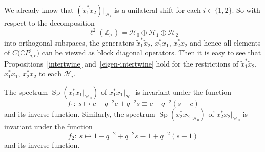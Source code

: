 We already know that $( \tilde{x}_{1}^{\ast}\tilde{x}_{2})
|_{\mathcal{H}_{i}}$ is a unilateral shift for each $i\in\{ 1,2\}
$. So with respect to the decomposition
\[
\ell^{2}( \mathbb{Z}_{\geq}) =\mathcal{H}_{0}\oplus
\mathcal{H}_{1}\oplus\mathcal{H}_{2}%
\]
into orthogonal subspaces, the generators $\tilde{x}_{1}^{\ast}\tilde{x}_{2}$,
$x_{1}^{\ast}x_{1}$, $x_{2}^{\ast}x_{2}$ and hence all elements of $C\big(
\mathbb{C}P_{q,c}^{1}\big) $ can be viewed as block diagonal operators.
Then it is easy to see that Propositions~\ref{intertwine} and~\ref{eigen-intertwine} hold for the
restrictions of $\tilde{x}_{1}^{\ast}\tilde{x}_{2}$, $x_{1}^{\ast}x_{1}$,
$x_{2}^{\ast}x_{2}$ to each $\mathcal{H}_{i}$.

\begin{lemma}\label{invariant-spectrum} The spectrum $\operatorname{Sp}( x_{1}^{\ast}%
x_{1}|_{\mathcal{H}_{0}}) $ of $x_{1}^{\ast}x_{1}|_{\mathcal{H}_{0}}$
is invariant under the function
\[
f_{1}\colon \ s\mapsto c-q^{-2}c+q^{-2}s\equiv c+q^{-2}(s-c)
\]
and its inverse function. Similarly, the spectrum $\operatorname{Sp}(
x_{2}^{\ast}x_{2}|_{\mathcal{H}_{0}}) $ of $x_{2}^{\ast}x_{2}%
|_{\mathcal{H}_{0}}$ is invariant under the function%
\[
f_{2}\colon \ s\mapsto1-q^{-2}+q^{-2}s\equiv1+q^{-2}(s-1)
\]
and its inverse function.
\end{lemma}

